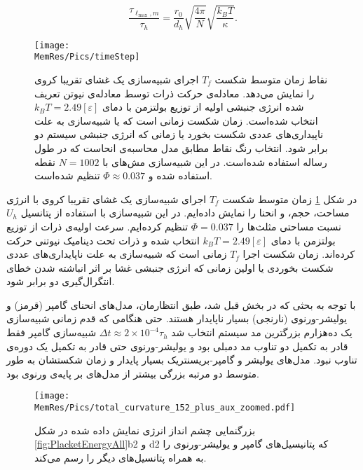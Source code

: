 \begin{equation}
\frac{\tau_{\ell_\text{max},m}}{\tau_{h}}=\frac{r_0}{d_h}\sqrt{\frac{4\pi }{N}}\sqrt{\frac{k_BT}{\kappa}}.
\end{equation}


\begin{figure}[htbp]
\begin{center}
\texttt{[image: \\MemRes/Pics/timeStep]}
\caption{
نقاط زمان متوسط شکست 
 $T_f$
اجرای شبیه‌سازی یک غشای تقریبا کروی را نمایش می‌دهد. معادله‌ی حرکت ذرات توسط معادله‌ی نیوتن تعریف شده انرژی جنبشی اولیه از توزیع بولتزمن با دمای
 $k_BT=2.49[\varepsilon]$
انتخاب شده‌است. زمان شکست زمانی است که یا شبیه‌سازی به علت ناپیداری‌های عددی شکست بخورد یا زمانی که انرژی جنبشی سیستم دو برابر شود. انتخاب رنگ نقاط مطابق مدل محاسبه‌ی انحاست که در طول رساله استفاده شده‌است. در این شبیه‌سازی مش‌های با 
$N=1002$
نقطه استفاده شده و 
$\Phi\approx0.037$
تنظیم شده‌است.
}
\label{fig:timeSteps}
\end{center}
\end{figure}
در شکل 
\ref{fig:timeSteps}
زمان متوسط شکست
$T_f$
اجرای شبیه‌سازی یک غشای تقریبا کروی با انرژی مساحت، حجم، و انحنا را نمایش داده‌ایم. در این شبیه‌سازی با استفاده از پتانسیل 
$U_h$
نسبت مساحتی مثلث‌ها را 
$\Phi=0.037$
تنظیم کرده‌ایم. سرعت اولیه‌ی ذرات از توزیع بولتزمن با دمای 
$k_BT=2.49[\varepsilon]$
انتخاب شده‌ و ذرات تحت دینامیک نیوتنی حرکت کرده‌اند. زمان شکست اجرا
$T_f$
 زمانی است که شبیه‌سازی به علت ناپایداری‌های عددی شکست بخوردی یا اولین زمانی که انرژی جنبشی غشا بر اثر انباشته شدن خطای انتگرال‌گیری دو برابر شود. 
 
 با توجه به بحثی که در بخش قبل شد، طبق انتظارمان، مدل‌های انحنای گامپر (قرمز) و یولیشر-ورنوی (نارنجی) بسیار ناپایدار هستند. حتی هنگامی که قدم زمانی شبیه‌سازی یک ده‌هزارم بزرگترین مد سیستم انتخاب شد
 $\Delta t \approx 2\times10^{-4}\tau_{h} $
شبیه‌سازی گامپر فقط قادر به تکمیل دو تناوب مد دمبلی بود و یولیشر-ورنوی حتی قادر به تکمیل یک دوره‌ی تناوب نبود. 
مد‌ل‌های یولیشر و گامپر-بریسنتریک بسیار پایدار و زمان شکستشان به طور متوسط دو مرتبه بزرگی بیشتر از مدل‌های بر پایه‌ی ورنوی بود. 

\begin{figure}[htbp]
\begin{center}
\texttt{[image: \\MemRes/Pics/total\_curvature\_152\_plus\_aux\_zoomed.pdf]}
\caption{
بزرگنمایی چشم انداز انرژی نمایش داده شده در شکل 
\ref{fig:PlacketEnergyAll}b2
و
d2
که پتانیسیل‌های گامپر و یولیشر-ورنوی را به همراه پتانسیل‌های دیگر را رسم می‌کند.
}
\label{fig:PlacketEnergyAllZoomed}
\end{center}
\end{figure}

